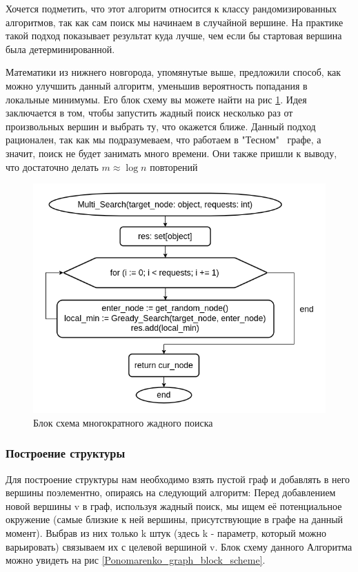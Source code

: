 Хочется подметить, что этот алгоритм относится к классу рандомизированных алго\-ритмов,
так как сам поиск мы начинаем в случайной вершине. На практике такой подход показывает
результат куда лучше, чем если бы стартовая вершина была детерминирован\-ной.


Математики из нижнего новгорода, упомянутые выше, предложили способ, как можно улучшить
данный алгоритм, уменьшив вероятность попадания в локальные минимумы. Его блок схему
вы можете найти на рис \ref{multi_search_block_scheme}. Идея заключается в том, чтобы
запустить жадный поиск несколько раз от произвольных вершин и выбрать ту, что окажется ближе.
Данный подход рационален, так как мы подразумеваем, что работаем в "Тесном" \ графе, а значит,
поиск не будет занимать много времени. Они также пришли к выводу, что достаточно делать
$m \approx \log{n}$ повторений

\begin{figure}[H]
    \centering
    \includegraphics[scale=0.6]{./pictures/Multi_Search.png}
    \caption{Блок схема многократного жадного поиска} \label{multi_search_block_scheme}
\end{figure}

\subsubsection{Построение структуры}

Для построение структуры нам необходимо взять пустой граф и добавлять в него вершины
поэлементно, опираясь на следующий алгоритм: Перед добавлением новой вер\-шины v в граф, 
используя жадный поиск, мы ищем её потенциальное окружение (самые близкие к ней вершины,
присутствующие в графе на данный момент). Выбрав из них только k штук (здесь k - параметр, который
можно варьировать) связываем их с целевой вершиной v. Блок схему данного Алгоритма можно
увидеть на рис \ref{Ponomarenko_graph_block_scheme}.

